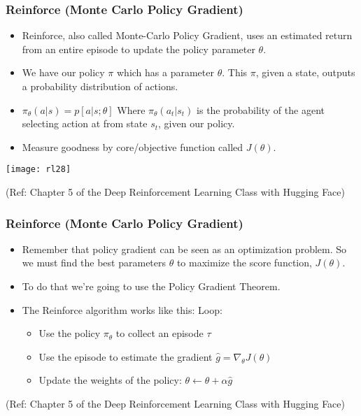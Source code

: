 \begin{frame}[fragile]\frametitle{Reinforce (Monte Carlo Policy Gradient)}

\begin{itemize}
\item Reinforce, also called Monte-Carlo Policy Gradient, uses an estimated return from an entire episode to update the policy parameter $\theta$.
\item We have our policy  $\pi$ which has a parameter $\theta$. This $\pi$, given a state, outputs a probability distribution of actions.
\item $\pi_\theta(a|s) = p[a|s;\theta]$ Where $\pi_\theta(a_t|s_t)$ is the probability of the agent selecting action at from state $s_t$, given our policy.
\item Measure goodness by core/objective function called $J(\theta)$.
\end{itemize}


\begin{center}
\texttt{[image: rl28]}
\end{center}

{\tiny (Ref: Chapter 5 of the Deep Reinforcement Learning Class with Hugging Face)}

\end{frame}


\begin{frame}[fragile]\frametitle{Reinforce (Monte Carlo Policy Gradient)}

\begin{itemize}
\item Remember that policy gradient can be seen as an optimization problem. So we must find the best parameters $\theta$ to maximize the score function, $J(\theta)$.

\item To do that we’re going to use the Policy Gradient Theorem. 
\item The Reinforce algorithm works like this: Loop:
\begin{itemize}
\item Use the policy $\pi_\theta$ to collect an episode $\tau$
\item Use the episode to estimate the gradient $\hat{g} = \nabla_\theta J(\theta)$ 
\item Update the weights of the policy: $\theta \leftarrow \theta + \alpha \hat{g}$
\end{itemize}
\end{itemize}

{\tiny (Ref: Chapter 5 of the Deep Reinforcement Learning Class with Hugging Face)}

\end{frame}



